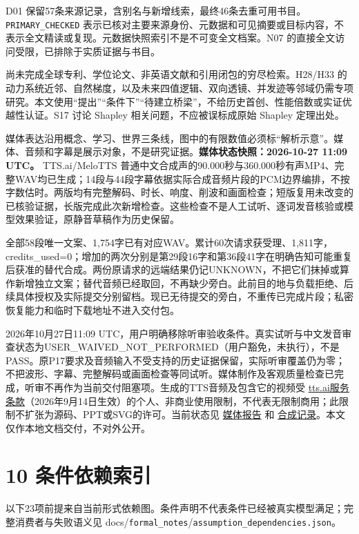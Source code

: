 \documentclass[
  10pt,
]{article}
\begin{document}
D01
保留57条来源记录，含别名与新增线索，最终46条去重可用书目。\nolinkurl{PRIMARY_CHECKED}
表示已核对主要来源身份、元数据和可见摘要或目标内容，不表示全文精读或复现。元数据快照索引不是不可变全文档案。N07
的直接全文访问受限，已排除于实质证据与书目。

尚未完成全球专利、学位论文、非英语文献和引用闭包的穷尽检索。H28/H33
的动力系统近邻、自然梯度，以及未来四值逻辑、双向透镜、并发迹等邻域仍需专项研究。本文使用``提出''``条件下''``待建立桥梁''，不给历史首创、性能倍数或实证优越性认证。S17
讨论 Shapley 相关问题，不应被误标成原始 Shapley 定理出处。

媒体表达沿用概念、学习、世界三条线，图中的有限数值必须标``解析示意''。媒体、音频和字幕是展示对象，不是研究证据。\textbf{媒体状态快照：2026-10-27
11:09 UTC。} TTS.ai/MeloTTS
普通中文合成声的90.000秒与360.000秒有声MP4、完整WAV均已生成；14段与44段字幕依据实际合成音频片段的PCM边界编排，不按字数估时。两版均有完整解码、时长、响度、削波和画面检查；短版复用未改变的已核验证据，长版完成此次新增检查。这些检查不是人工试听、逐词发音核验或模型效果验证，原静音草稿作为历史保留。

全部58段唯一文案、1,754字已有对应WAV。累计60次请求获受理、1,811字，credits\_used=0；增加的两次分别是第29段16字和第36段41字在明确告知可能重复后获准的替代合成。两份原请求的远端结果仍记UNKNOWN，不把它们抹掉或算作新增独立文案；替代音频已经取回，不再缺少旁白。此前目的地与负载拒绝、后续具体授权及实际提交分别留档。现已无待提交的旁白，不重传已完成片段；私密恢复能力和临时下载地址不进入交付包。

2026年10月27日11:09 UTC，用户明确移除听审验收条件。真实试听与中文发音审查状态为USER\_WAIVED\_NOT\_PERFORMED（用户豁免，未执行），不是PASS。原P17要求及音频输入不受支持的历史证据保留，实际听审覆盖仍为零；不把波形、字幕、完整解码或画面检查等同试听。媒体制作及客观质量检查已完成，听审不再作为当前交付阻塞项。生成的TTS音频及包含它的视频受
\href{https://tts.ai/terms/}{tts.ai服务条款}（2026年9月14日生效）的个人、非商业使用限制，不代表无限制商用；此限制不扩张为源码、PPT或SVG的许可。当前状态见
\href{reports/media_qa.json}{媒体报告} 和
\href{assets/audio/tts_ai/generation_summary.json}{合成记录}。本文仅作本地文档交付，不对外公开。

\section{10 条件依赖索引}\label{ux6761ux4ef6ux4f9dux8d56ux7d22ux5f15}

以下23项前提来自当前形式依赖图。条件声明不代表条件已经被真实模型满足；完整消费者与失败语义见
docs/\nolinkurl{formal_notes}/\nolinkurl{assumption_dependencies.json}。
\end{document}
